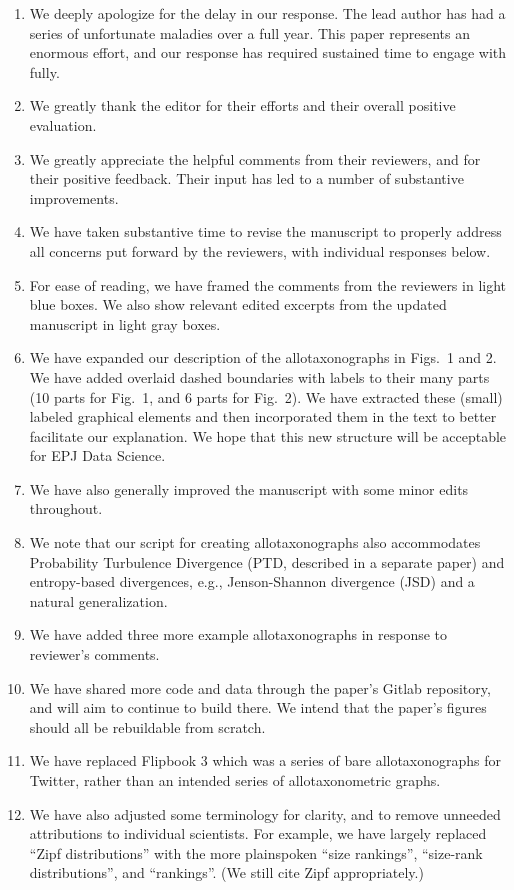 \begin{enumerate}
\item 
  We deeply apologize for the delay in our response. The lead author
  has had a series of unfortunate maladies over a full year. This
  paper represents an enormous effort, and our response
  has required sustained time to
  engage with fully.
\item 
  We greatly thank the editor for their efforts and their overall positive evaluation.
\item 
  We greatly appreciate the helpful comments from their reviewers,
  and for their positive feedback.
  Their input has led to a number of substantive improvements.
\item 
  We have taken substantive time to revise the manuscript
  to properly address all concerns put forward by the reviewers, with individual responses below.
\item 
  For ease of reading, we have framed the comments from the reviewers in light blue boxes.
  We also show relevant edited excerpts from the updated manuscript in light gray boxes.
\item
  We have expanded our description of the allotaxonographs in Figs.~1 and 2.
  We have added overlaid dashed boundaries with labels to their many parts
  (10 parts for Fig.~1, and 6 parts for Fig.~2).
  We have extracted these (small) labeled graphical elements
  and then incorporated them in the text
  to better facilitate our explanation.
  We hope that this new structure will
  be acceptable for EPJ Data Science.
\item 
  We have also generally improved the manuscript with some minor edits throughout.
\item
  We note that our script for creating allotaxonographs also accommodates
  Probability Turbulence Divergence (PTD, described in a separate paper)
  and
  entropy-based divergences,
  e.g., Jenson-Shannon divergence (JSD) and a natural generalization.
\item
  We have added three more example allotaxonographs in response to reviewer's comments.
\item
  We have shared more code and data through
  the paper's Gitlab repository, and will aim to continue to build there.
  We intend that the paper's figures should all be rebuildable from scratch.
\item
  We have replaced Flipbook 3 which was a series of bare allotaxonographs
  for Twitter, rather than an intended series of allotaxonometric graphs.
\item
  We have also adjusted some terminology for clarity,
  and to remove unneeded attributions to individual scientists.
  For example, we have largely replaced ``Zipf distributions'' with
  the more
  plainspoken ``size rankings'', ``size-rank distributions'', and ``rankings''.
  (We still cite Zipf appropriately.)
\end{enumerate}

